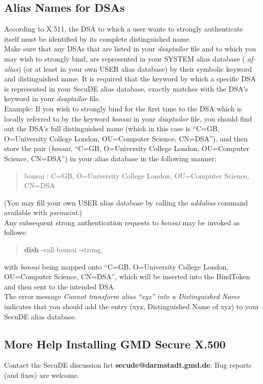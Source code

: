 \subsection{Alias Names for DSAs}
\label{dsaaliases}
According to X.511, the DSA to which a user wants to strongly authenticate itself
must be identified by its complete distinguished name.
\\ [1em]
Make sure that any DSAs that are listed in your {\em dsaptailor} file and to which you may
wish to strongly bind, are represented in your SYSTEM alias database
({\em .af-alias}) (or at least in your own USER alias database) by their symbolic keyword and 
distinguished name.
It is required that the keyword by which a specific DSA is represented in your 
SecuDE alias database, exactly matches with the DSA's keyword in your {\em dsaptailor} file.
\\ [1em]
Example: If you wish to strongly bind for the first time to the DSA which is locally referred
to by the keyword {\em bonsai} in your {\em dsaptailor} file, you should find out the DSA's full
distinguished name (which in this case is 
``C=GB, O=University College London, OU=Computer Science, CN=DSA''),
and then store the pair ({\em bonsai}, ``C=GB, O=University College London, OU=Computer Science, CN=DSA'') in your alias database in the following manner:
\begin{quote}
{\small bonsai : C=GB, O=University College London, OU=Computer Science, CN=DSA}
\end{quote}
(You may fill your own USER alias database by calling the {\em addalias} command available with
{\em psemaint}.)
\\ [1em]
Any subsequent strong authentication requests to {\em bonsai} may be invoked as follows:
\begin{quote}
{\bf dish} -call bonsai -strong,
\end{quote}
with {\em bonsai} being mapped onto ``C=GB, O=University College London, OU=Computer Science, CN=DSA'',
which will be inserted into the BindToken and then sent to the intended DSA.
\\ [1em]
The error message {\em Cannot transform alias ``xyz'' into a Distinguished Name} indicates that you
should add the entry (xyz, Distinguished Name of xyz) to your SecuDE alias database.


\subsection{More Help Installing GMD Secure X.500}
Contact the SecuDE discussion list {\bf secude@darmstadt.gmd.de}. Bug reports (and fixes) are
welcome.
